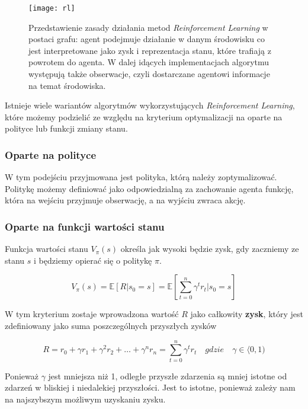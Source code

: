 \documentclass{article}
\begin{document}
\begin{figure}[h]
\centering
\texttt{[image: rl]}
\caption{Przedstawienie zasady działania metod \emph{Reinforcement Learning} w postaci grafu: agent podejmuje działanie w danym środowisku co jest interpretowane jako zysk i reprezentacja stanu, które trafiają z powrotem do agenta. W dalej idących implementacjach algorytmu występują także obserwacje, czyli dostarczane agentowi informacje na temat środowiska.}
\end{figure}

Istnieje wiele wariantów algorytmów wykorzystujących \emph{Reinforcement Learning}, które możemy podzielić ze względu na kryterium optymalizacji na oparte na polityce lub funkcji zmiany stanu.

\subsubsection*{\Large{Oparte na polityce}}
W tym podejściu przyjmowana jest polityka, którą należy zoptymalizować. Politykę możemy definiować jako odpowiedzialną za zachowanie agenta funkcję, która na wejściu przyjmuje obserwację, a na wyjściu zwraca akcję.  

\subsubsection*{\Large{Oparte na funkcji wartości stanu}}
Funkcja wartości stanu $V_{\pi}(s)$ określa jak wysoki będzie zysk, gdy zaczniemy ze stanu $s$ i będziemy opierać się o politykę $\pi$. 

\[V_{\pi}(s) = \mathbb{E}[R | s_0=s] = \mathbb{E} \left[\sum_{t=0}^n \gamma^t r_t | s_0=s \right]\]

W tym kryterium zostaje wprowadzona wartość $R$ jako całkowity \textbf{zysk}, który jest zdefiniowany jako suma poszczególnych przyszłych zysków

\[R = r_{0} + \gamma r_1 + \gamma^2 r_2 + \ldots + \gamma^n r_n = \sum_{t=0}^n \gamma^t r_t \quad gdzie \quad \gamma \in \langle 0, 1)\]

Ponieważ $\gamma$ jest mniejsza niż 1, odległe przyszłe zdarzenia są mniej istotne od zdarzeń w bliskiej i niedalekiej przyszłości. Jest to istotne, ponieważ zależy nam na najszybszym możliwym uzyskaniu zysku.
\end{document}
